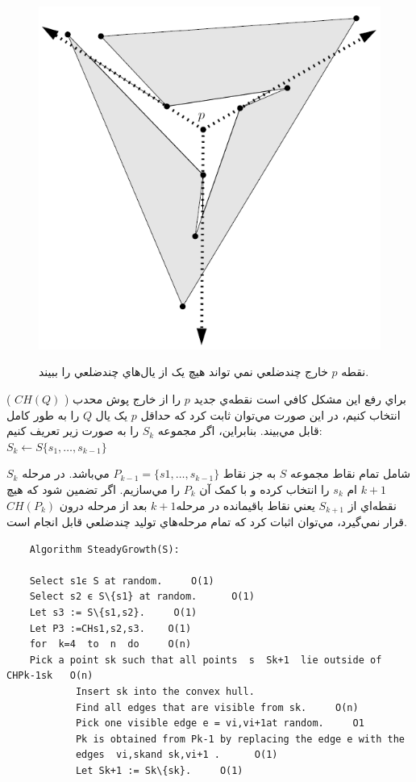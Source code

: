 \documentclass{book}
\begin{document}
\begin{figure}[h!]
    \begin{center}
        \includegraphics[width=\linewidth]{see_exception2.jpg}
        \label{see_exception2}
        \caption{ نقطه $p$  خارج چندضلعي نمي تواند هيچ‌ يک از يال‌هاي چندضلعي را ببيند.}
    \end{center}
\end{figure}

براي رفع اين مشکل کافي است نقطه‌ي جديد $p$ را از خارج پوش محدب ( $CH(Q)$ ) انتخاب کنيم، در اين صورت مي‌توان ثابت کرد که حداقل $p$ يک يال $Q$ را به ‌طور کامل قابل مي‌بيند. بنابراين، اگر مجموعه $S_k$ را به صورت زير تعريف کنيم:     $S_k\leftarrow S\{s_1,…, s_{k-1}\}$

$S_k$ شامل تمام نقاط مجموعه $S$ به جز نقاط $P_{k-1}=\{s1,…, s_{k-1}\}$ مي‌باشد. در مرحله$k+1$  ام $s_k$ را انتخاب کرده و با کمک آن $P_k$  را مي‌سازيم. اگر تضمين شود که هيچ نقطه‌اي از $S_{k+1}$ يعني نقاط باقيمانده در مرحله$k+1$ بعد از مرحله درون $CH(P_k)$ قرار نمي‌گيرد، مي‌توان اثبات کرد که تمام مرحله‌هاي توليد چندضلعي قابل انجام است.


\begin{latin}
\begin{verbatim}
    Algorithm SteadyGrowth(S):

    Select s1ϵ S at random.     O(1) 
    Select s2 ϵ S\{s1} at random.      O(1) 
    Let s3 := S\{s1,s2}.     O(1) 
    Let P3 :=CHs1,s2,s3.    O(1) 
    for  k=4  to  n  do     O(n) 
    Pick a point sk such that all points  s  Sk+1  lie outside of CHPk-1sk   O(n)
            Insert sk into the convex hull. 
            Find all edges that are visible from sk.     O(n) 
            Pick one visible edge e = vi,vi+1at random.     O1
            Pk is obtained from Pk-1 by replacing the edge e with the 
            edges  vi,skand sk,vi+1 .      O(1)
            Let Sk+1 := Sk\{sk}.     O(1)  
\end{verbatim}
\end{latin}
\end{document}

